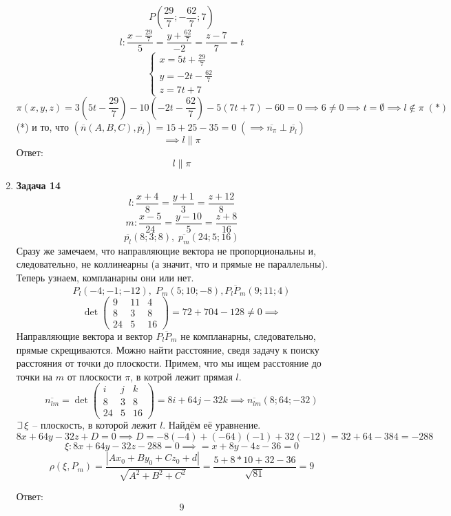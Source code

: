 \documentclass{article}
\theoremstyle{plain}
\def\letus{%
    \mathord{\setbox0=\hbox{$\exists$}%
             \hbox{\kern 0.125\wd0%
                   \vbox to \ht0{%
                      \hrule width 0.75\wd0%
                      \vfill%
                      \hrule width 0.75\wd0}%
                   \vrule height \ht0%
                   \kern 0.125\wd0}%
           }%
}
\begin{document}
\begin{enumerate}
$$P(\frac{29}{7}; -\frac{62}{7}; 7)$$
$$ l : \frac{x - \frac{29}{7}}{5} = \frac{y + \frac{62}{7}}{-2} = \frac{z - 7}{7} = t $$
\begin{equation}
    \begin{cases}
    x = 5t + \frac{29}{7}\\
    y = -2t - \frac{62}{7}\\
    z = 7t + 7
    \end{cases}
\end{equation}
$$\pi(x, y, z) = 3(5t - \frac{29}{7}) - 10(-2t - \frac{62}{7}) - 5(7t + 7) - 60 = 0\implies 6 \neq 0\implies t = \emptyset \implies l \not\in \pi \; (*)$$
(*) и то, что $(\overline{n}(A, B, C), \overline{p_l}) = 15 + 25 - 35 = 0 \;(\implies \overline{n_\pi} \perp \overline{p_l})$
$$\implies l \parallel \pi $$
Ответ: 
$$ l \parallel \pi$$
\item \textbf{Задача 14}
$$l: \frac{x + 4}{8} = \frac{y + 1}{3} = \frac{z + 12}{8}$$
$$m: \frac{x - 5}{24} = \frac{y - 10}{5} = \frac{z + 8}{16}$$
$$\overline{p_l} (8; 3; 8),\; \overline{p_m}(24; 5; 16)$$
Сразу же замечаем, что направляющие вектора не пропорциональны и, следовательно, не коллинеарны (а значит, что и прямые не параллельны). Теперь узнаем, компланарны они или нет.
$$ P_l(-4; -1; -12),\; P_m(5; 10; -8), \overline{P_lP_m}(9; 11; 4)$$
$$ \det\begin{pmatrix}
    9 & 11 & 4\\
    8 & 3 & 8 \\
    24 & 5 & 16
\end{pmatrix}  = 72 + 704 - 128 \neq 0 \implies $$
Направляющие вектора и вектор $\overline{P_lP_m}$ не компланарны, следовательно, прямые скрещиваются. 
Можно найти расстояние, сведя задачу к поиску расстояния от точки до плоскости. Примем, что мы ищем расстояние до точки на $m$ от плоскости $\pi$, в котрой лежит прямая $l$.
$$ \overline{n_{lm}} = \det\begin{pmatrix}
    i & j & k \\
    8 & 3 & 8 \\
    24 & 5 & 16 
\end{pmatrix}  = 8i + 64j - 32k \implies \overline{n_{lm}}(8; 64; -32)$$
$\letus\,\xi$ -- плоскость, в которой лежит $l$. Найдём её уравнение. 
$$ 8x + 64y - 32z + D = 0 \implies D = -8 (-4) + (-64)(-1) + 32(-12) = 32 + 64 - 384 = -288  $$
$$ \xi: 8x + 64y - 32z - 288 = 0 \implies = x + 8 y - 4z - 36 = 0$$
$$ \rho(\xi, P_m) = \frac{|Ax_0 + By_0 + Cz_0 + d|}{\sqrt{A^2 + B^2 + C^2}} = \frac{5 + 8 * 10 + 32 - 36}{\sqrt{81}} = 9 $$

Ответ:
$$9$$
\end{enumerate}
\end{document}
